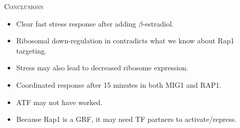 \documentclass{beamer}
\begin{document}
\begin{frame}
    \begin{center}
        {\large \textsc{Conclusions}}
    \end{center}

    \begin{itemize}
        \item Clear fast stress response after adding $\beta$-estradiol.
        \item Ribosomal down-regulation in contradicts what we know about Rap1 targeting.
        \item Stress may also lead to decreased ribosome expression.
        \item Coordinated response after 15 minutes in both MIG1 and RAP1.
            \bigskip
        \item ATF may not have worked.
        \item Because Rap1 is a GRF, it may need TF partners to activate/repress.
    \end{itemize}
\end{frame}
\end{document}
